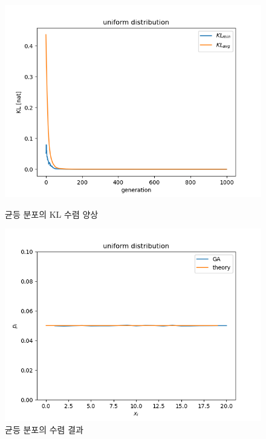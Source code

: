 \pagebreak
\begin{figure}[!htb]
    \centering
    \begin{minipage}{.5\textwidth}
        \centering
        \includegraphics[width=\linewidth, height=0.63\linewidth]{images/uniform convergence KL.png}
        \caption{균등 분포의 KL 수렴 양상}
        \label{fig:uniform KL}
    \end{minipage}%
    \begin{minipage}{0.5\textwidth}
        \centering
        \includegraphics[width=\linewidth, height=0.63\linewidth]{images/uniform result.png}
        \caption{균등 분포의 수렴 결과}
        \label{fig:prob1_6_1}
    \end{minipage}
\end{figure}
